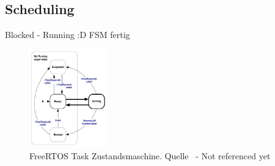 \subsection{Scheduling}
\label{Scheduling}
Blocked - Running :D FSM fertig
\begin{figure}[ht!]
	\centering
		\includegraphics[width=0.3\textwidth]{Pictures/FreeRTOSOrg/taskStates.png}
	\caption{FreeRTOS Task Zustandsmaschine. Quelle~\protect{} - Not referenced yet}
	\label{fig:FreeRTOSFsm}
\end{figure}